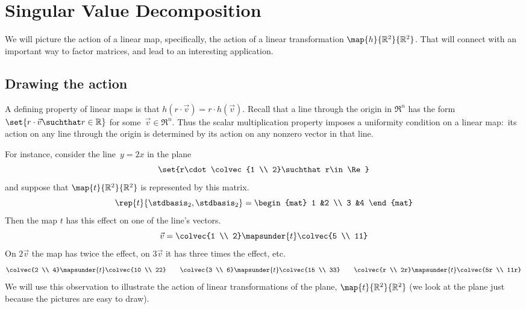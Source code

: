 \chapter{Singular Value Decomposition}
\label{chap:SingularValueDecomposition}

We will picture the action of a linear map,
specifically, the action of a linear transformation $\map{h}{\Re^2}{\Re^2}$.
That will connect with an important way to factor matrices, and lead to
an interesting application.


\section{Drawing the action}
A defining property of linear maps is that 
$h(r\cdot\vec{v})=r\cdot h(\vec{v})$.
Recall that a line through the origin in $\Re^n$ has the form 
$\set{r\cdot \vec{v}\suchthat r\in\Re}$ for some~$\vec{v}\in\Re^n$. 
Thus the scalar multiplication property  
imposes a uniformity condition on a linear map:~its action on any 
line through the origin is determined by its action
on any nonzero vector in that line.

For instance, consider the line~$y=2x$ in the plane
\begin{equation*}
  \set{r\cdot\colvec{1 \\ 2}\suchthat r\in\Re}
\end{equation*}
and suppose that $\map{t}{\Re^2}{\Re^2}$ is represented by this matrix.
\begin{equation*}
  \rep{t}{\stdbasis_2,\stdbasis_2}
  =
  \begin{mat}
    1 &2 \\
    3 &4
  \end{mat}
\end{equation*}
Then the map $t$ has this effect on one of the line's vectors.
\begin{equation*}
  \vec{v}=\colvec{1 \\ 2}\mapsunder{t}\colvec{5 \\ 11}
\end{equation*}
On $2\vec{v}$ the 
map has twice the effect, on  $3\vec{v}$ it has three times the
effect, etc.
\begin{equation*}
  \colvec{2 \\ 4}\mapsunder{t}\colvec{10 \\ 22}
  \qquad
  \colvec{3 \\ 6}\mapsunder{t}\colvec{15 \\ 33}
  \qquad
  \colvec{r \\ 2r}\mapsunder{t}\colvec{5r \\ 11r}
\end{equation*}
We will use this observation to illustrate the action of 
linear transformations of the plane, $\map{t}{\Re^2}{\Re^2}$
(we look at the plane just because the pictures are 
easy to draw). 

